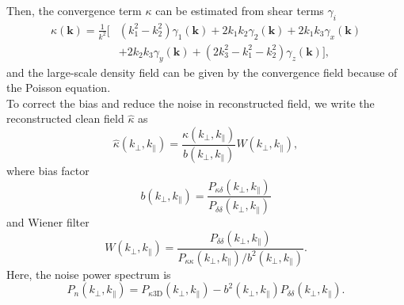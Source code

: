 Then, the convergence term $\kappa$ can be estimated from shear terms 
$\gamma_{i}$ 
 \begin{equation}
 \label{equ:kappa3D}
 \begin{split}
 \kappa(\bm{k})=
 \frac{1}{k^{2}}
 [
&(k_{1}^{2}-k_{2}^{2})\gamma_{1}(\bm{k})
 +2k_{1}k_{2}\gamma_{2}(\bm{k}) 
 +2k_{1}k_{3}\gamma_{x}(\bm{k})\\
&+2k_{2}k_{3}\gamma_{y}(\bm{k})
 +(2k_{3}^2-k_1^2-k_2^2)\gamma_{z}(\bm{k})
 ],
 \end{split}
 \end{equation}
and the large-scale density field can be given by the convergence field
because of the Poisson equation.\\
To correct the bias and reduce the noise in reconstructed field,
 we write the reconstructed clean field $\hat{\kappa}$ as 
\begin{equation}
\label{eq:kappa}
\hat{\kappa}(k_{\perp},k_{\parallel})=\frac{\kappa(k_{\perp},k_{\parallel})}{b(k_{\perp},k_{\parallel})} W(k_{\perp},k_{\parallel}),
\end{equation}
where bias factor 
\begin{equation}
b(k_{\perp},k_{\parallel})=\frac{P_{\kappa\delta}(k_{\perp},k_{\parallel})}{P_{\delta\delta}(k_{\perp},k_{\parallel})}
\label{equ:bias}
\end{equation}
 and Wiener filter 
\begin{equation}
W(k_{\perp},k_{\parallel})=\frac{P_{\delta\delta}(k_{\perp},k_{\parallel})}{P_{\kappa\kappa}(k_{\perp},k_{\parallel})/b^{2}(k_{\perp},k_{\parallel})}.
\end{equation}
Here, the noise power spectrum is 
\begin{equation}
P_{n}(k_{\perp},k_{\parallel})=P_{\kappa 3\mathrm{D}}(k_{\perp},k_{\parallel})-b^2(k_{\perp},k_{\parallel})P_{\delta\delta}(k_{\perp},k_{\parallel}).
\end{equation}
